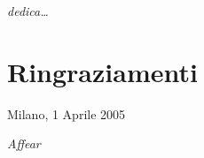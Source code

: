 \thispagestyle{empty}

\begin{flushright}
\Large\textit{dedica\dots}
\end{flushright}


\cleardoublepage


\chapter*{Ringraziamenti}

\begin{flushleft}
Milano, 1 Aprile 2005
\end{flushleft}

\begin{flushright}
\emph{Affear}
\end{flushright}

\cleardoublepage
\thispagestyle{empty}